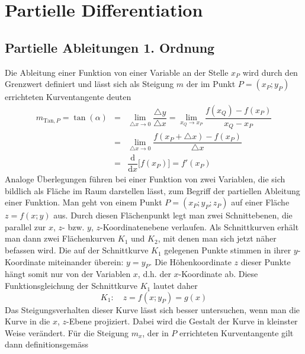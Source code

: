 \section{Partielle Differentiation}
\subsection{Partielle Ableitungen 1. Ordnung}
Die Ableitung einer Funktion von einer Variable an der Stelle $x_P$ wird durch den Grenzwert definiert und lässt sich als Steigung $m$ der im Punkt $P=\left(x_P; y_P\right)$ errichteten Kurventangente deuten
\begin{equation}
\boxed{\begin{array}{lll}
m_{\text{Tan},P}=\tan\left(\alpha\right)&=&\displaystyle \lim_{\triangle x\rightarrow 0}\dfrac{\triangle y}{\triangle x}=\displaystyle \lim_{x_Q\rightarrow x_P}\dfrac{f\left(x_Q\right)-f\left(x_P\right)}{x_Q-x_P}\\
&=&\displaystyle \lim_{\triangle x\rightarrow 0}\dfrac{f\left(x_P+\triangle x\right)-f\left(x_P\right)}{\triangle x}\\
&=&\dfrac{\text{d}}{\text{d}x}\Big[f\left(x_P\right)\Big]=f'\left(x_P\right)
\end{array}}
\end{equation}
Analoge Überlegungen führen bei einer Funktion von zwei Variablen, die sich bildlich als Fläche im Raum darstellen lässt, zum Begriff der partiellen Ableitung einer Funktion. Man geht von einem Punkt $P=\left(x_P; y_P; z_P\right)$ auf einer Fläche $z=f\left(x; y\right)$ aus. Durch diesen Flächenpunkt legt man zwei Schnittebenen, die parallel zur $x$, $z$- bzw. $y$, $z$-Koordinatenebene verlaufen. Als Schnittkurven erhält man dann zwei Flächenkurven $K_1$ und $K_2$, mit denen man sich jetzt näher befassen wird.
\newline\newline
Die auf der Schnittkurve $K_1$ gelegenen Punkte stimmen in ihrer $y$-Koordinate miteinander überein: $y=y_P$. Die Höhenkoordinate $z$ dieser Punkte hängt somit nur von der Variablen $x$, d.h. der $x$-Koordinate ab. Diese Funktionsgleichung der Schnittkurve $K_1$ lautet daher
\begin{equation} 
\boxed{K_1:\quad z=f\left(x; y_P\right)=g\left(x\right)}
\end{equation} 
Das Steigungsverhalten dieser Kurve lässt sich besser untersuchen, wenn man die Kurve in die $x$, $z$-Ebene projiziert. Dabei wird die Gestalt der Kurve in kleinster Weise verändert. Für die Steigung $m_x$, der in $P$ errichteten Kurventangente gilt dann definitionsgemäss
